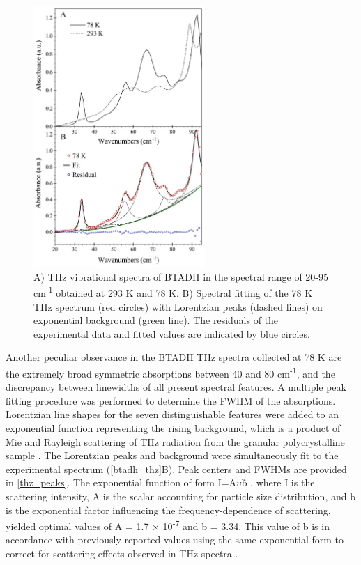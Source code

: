 \begin{figure}[h!]
  \center
  \includegraphics[width=6.5cm]{src/figures/btadh_figs/btadh_fig3.png}
  \caption{A) THz vibrational spectra of BTADH in the spectral range of 20-95 cm\textsuperscript{-1} obtained at 293 K and 78 K. B) Spectral fitting of the 78 K THz spectrum (red circles) with Lorentzian peaks (dashed lines) on exponential background (green line). The residuals of the experimental data and fitted values are indicated by blue circles.}
  \label{btadh_thz}
\end{figure}
\newpage
Another peculiar observance in the BTADH THz spectra collected at 78 K are the extremely broad symmetric absorptions between 40 and 80 cm\textsuperscript{-1}, and the discrepancy between linewidths of all present spectral features. A multiple peak fitting procedure was performed to determine the FWHM of the absorptions. Lorentzian line shapes for the seven distinguishable features were added to an exponential function representing the rising background, which is a product of Mie and Rayleigh scattering of THz radiation from the granular polycrystalline sample \citep{shen_elimination_2008}. The Lorentzian peaks and background were simultaneously fit to the experimental spectrum (\autoref{btadh_thz}B). Peak centers and FWHMs are provided in \autoref{thz_peaks}. The exponential function of form I=A\(\upsilon\)\^b , where I is the scattering intensity, A is the scalar accounting for particle size distribution, and b is the exponential factor influencing the frequency-dependence of scattering, yielded optimal values of A = 1.7 × 10\textsuperscript{-7} and b = 3.34. This value of b is in accordance with previously reported values using the same exponential form to correct for scattering effects observed in THz spectra \citep{king_identification_2011, shen_elimination_2008}.

